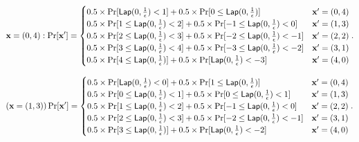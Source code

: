 \documentclass{article}
\begin{document}
{\scriptsize

\[
\dataobs = (0,4): \Pr[\dataobs']
= \begin{cases}
	0.5 \times 
 	\Pr[	\lap{0}{\frac{1}{\epsilon}}	<	1] 
 	+ 	
 	0.5 \times 
 	\Pr[	0	\leq \lap{0}{\frac{1}{\epsilon}}] 
%
	& \dataobs' = (0, 4)\\
%
 	0.5 \times 
 	\Pr[	1	\leq \lap{0}{\frac{1}{\epsilon}}	<	2] 
 	+ 	
 	0.5 \times 
 	\Pr[	-1	\leq \lap{0}{\frac{1}{\epsilon}}	<	0] 
%
	& \dataobs' = (1, 3)\\
%
 	0.5 \times 
 	\Pr[	2	\leq	\lap{0}{\frac{1}{\epsilon}}	<	3] 
 	+ 	
 	0.5 \times 
 	\Pr[	-2	\leq \lap{0}{\frac{1}{\epsilon}}	<	-1] 
%
	& \dataobs' = (2, 2)\\
%
 	0.5 \times 
 	\Pr[	3	\leq	\lap{0}{\frac{1}{\epsilon}}	< 4]
 	+ 	
 	0.5 \times 
 	\Pr[	-3	\leq	\lap{0}{\frac{1}{\epsilon}}	<	-2] 
%
	& \dataobs' = (3, 1)\\
%
 	0.5 \times 
 	\Pr[	4	\leq	\lap{0}{\frac{1}{\epsilon}}]
 	+ 	
 	0.5 \times 
 	\Pr[	\lap{0}{\frac{1}{\epsilon}}	<	-3] 
%
	& \dataobs' = (4, 0)
\end{cases}.
\]

\[
(\dataobs = (1,3)) \Pr[\dataobs']
= \begin{cases}
 	0.5 \times 
 	\Pr[	\lap{0}{\frac{1}{\epsilon}}	<	0] 
 	+ 	
 	0.5 \times 
 	\Pr[	1	\leq \lap{0}{\frac{1}{\epsilon}}] 
	& \dataobs' = (0, 4)\\
%
 	0.5 \times 
 	\Pr[	0	\leq \lap{0}{\frac{1}{\epsilon}}	<	1] 
 	+ 	
 	0.5 \times 
 	\Pr[	0	\leq \lap{0}{\frac{1}{\epsilon}}	<	1] 
	& \dataobs' = (1, 3)\\
%
 	0.5 \times 
 	\Pr[	1	\leq	\lap{0}{\frac{1}{\epsilon}}	<	2] 
 	+ 	
 	0.5 \times 
 	\Pr[	-1	\leq \lap{0}{\frac{1}{\epsilon}}	<	0] 
	& \dataobs' = (2, 2)\\
%
 	0.5 \times 
 	\Pr[	2	\leq	\lap{0}{\frac{1}{\epsilon}}	<	3] 
 	+ 	
 	0.5 \times 
 	\Pr[	-2	\leq	\lap{0}{\frac{1}{\epsilon}}	<	-1] 
	& \dataobs' = (3, 1)\\
 	0.5 \times 
 	\Pr[	3	\leq	\lap{0}{\frac{1}{\epsilon}}] 
 	+ 	
 	0.5 \times 
 	\Pr[	\lap{0}{\frac{1}{\epsilon}}	<	-2] 
	& \dataobs' = (4, 0)
\end{cases}.
\]



}
\end{document}
